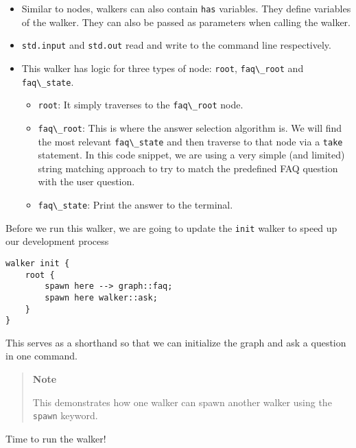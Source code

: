 \begin{itemize}
\tightlist
\item
  Similar to nodes, walkers can also contain
  \passthrough{\lstinline!has!} variables. They define variables of the
  walker. They can also be passed as parameters when calling the walker.
\item
  \passthrough{\lstinline!std.input!} and
  \passthrough{\lstinline!std.out!} read and write to the command line
  respectively.
\item
  This walker has logic for three types of node:
  \passthrough{\lstinline!root!}, \passthrough{\lstinline!faq\_root!}
  and \passthrough{\lstinline!faq\_state!}.

  \begin{itemize}
  \tightlist
  \item
    \passthrough{\lstinline!root!}: It simply traverses to the
    \passthrough{\lstinline!faq\_root!} node.
  \item
    \passthrough{\lstinline!faq\_root!}: This is where the answer
    selection algorithm is. We will find the most relevant
    \passthrough{\lstinline!faq\_state!} and then traverse to that node
    via a \passthrough{\lstinline!take!} statement. In this code
    snippet, we are using a very simple (and limited) string matching
    approach to try to match the predefined FAQ question with the user
    question.
  \item
    \passthrough{\lstinline!faq\_state!}: Print the answer to the
    terminal.
  \end{itemize}
\end{itemize}

Before we run this walker, we are going to update the
\passthrough{\lstinline!init!} walker to speed up our development
process

\begin{lstlisting}
walker init {
    root {
        spawn here --> graph::faq;
        spawn here walker::ask;
    }
}
\end{lstlisting}

This serves as a shorthand so that we can initialize the graph and ask a
question in one command.

\begin{quote}
\textbf{Note}

This demonstrates how one walker can spawn another walker using the
\passthrough{\lstinline!spawn!} keyword.
\end{quote}

Time to run the walker!

